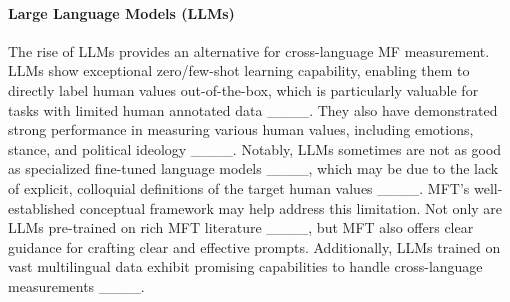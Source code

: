 

\paragraph{Large Language Models (LLMs)}
The rise of LLMs provides an alternative for cross-language MF measurement. LLMs show exceptional zero/few-shot learning capability, enabling them to directly label human values out-of-the-box, which is particularly valuable for tasks with limited human annotated data ____. They also have demonstrated strong performance in measuring various human values, including emotions, stance, and political ideology ____. Notably, LLMs sometimes are not as good as specialized fine-tuned language models ____, which may be due to the lack of explicit, colloquial definitions of the target human values ____. MFT’s well-established conceptual framework may help address this limitation. Not only are LLMs pre-trained on rich MFT literature ____, but MFT also offers clear guidance for crafting clear and effective prompts. Additionally, LLMs trained on vast multilingual data exhibit promising capabilities to handle cross-language measurements ____.

